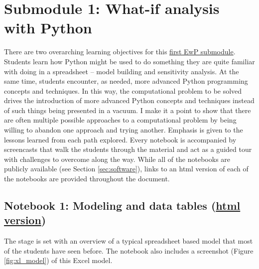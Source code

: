 \documentclass[ited,blindrev]{informs3}              %
\begin{document}
\section{Submodule 1: What-if analysis with Python}

There are two overarching learning objectives for this \href{http://www.sba.oakland.edu/faculty/isken/courses/aap/mod3a_whatif.html}{first EwP submodule}. Students learn how Python might be used to do something they are quite familiar with doing in a spreadsheet -- model building and sensitivity analysis. At the same time, students encounter, as needed, more advanced Python programming concepts and techniques. In this way, the computational problem to be solved drives the introduction of more advanced Python concepts and techniques instead of such things being presented in a vacuum. I make it a point to show that there are often multiple possible approaches to a computational problem by being willing to abandon one approach and trying another. Emphasis is given to the lessons learned from each path explored. Every notebook is accompanied by screencasts that walk the students through the material and act as a guided tour with challenges to overcome along the way. While all of the notebooks are publicly available (see Section \ref{sec:software}), links to an html version of each of the notebooks are provided throughout the document.
 
 
\subsection{Notebook 1: Modeling and data tables (\href{http://www.sba.oakland.edu/faculty/isken/excel_with_python/what_if_1_model_datatable.html}{html version})}

The stage is set with an overview of a typical spreadsheet based model that most of the students have seen before. The notebook also includes a screenshot (Figure \ref{fig:xl_model}) of this Excel model.
\end{document}
